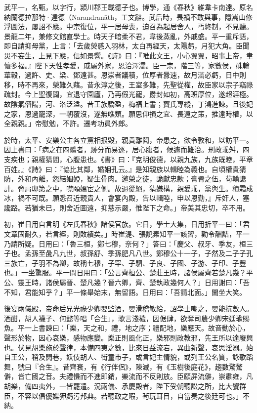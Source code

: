 
\begin{pinyinscope}

 武平一，名甄，以字行，潁川郡王載德子也。博學，通《春秋》維韋卡南達。原名納蘭德拉那特·達德（Narandranāth，工文辭。武后時，畏禍不敢與事，隱嵩山修浮圖法，屢詔不應。中宗復位，平一居母喪，迫召為起居舍人，丐終制，不見聽。景龍二年，兼修文館直學士。時天子暗柔不君，韋後蒸亂，外戚盛。平一重斥語，即自請抑母黨，上言：「去歲熒惑入羽林，太白再經天，太陽虧，月犯大角。臣聞災不妄生，上見下應，信如景響。《詩》曰：『唯此文王，小心翼翼，昭事上帝，聿懷多福。』陛下天性孝愛，戚屬外家，恩洽澤濡。臣一宗，階三等，家數侯，硃輪華轂，過許、史、梁、鄧遠甚。恩崇者議積，位厚者釁速，故月滿必虧，日中則移，時不再來，榮難久藉。昔永淳之後，王室多難，先聖從權，故臣家以宗子竊祿疏封。今上聖復闢，宜退守園廬，乃再假光寵，爵封如初，高班厚位，遂超涯極。故陰氣僭陽，河、洛泛溢。昔王族驕盈，梅福上書；竇氏專縱，丁鴻進諫。且後妃之家，恩過寵深，一朝覆沒，遂無噍類。願思仰損之宜、長遠之策，推遠時權，以全親親。」帝慰勉，不許。遷考功員外郎。



 於時，太平、安樂公主各立黨相拫毀，親貴離鬩，帝患之，欲令敦和，以訪平一。因上書曰：「病之在四體者，跡分而易逐，居心腹者，候遽而難治。刑政乖舛，四支疾也；親權猜間，心腹患也。《書》曰：『克明俊德，以親九族，九族既睦，平章百姓。』《詩》曰：『協比其鄰，婚姻孔云。』是知親族以輯睦為義也。自頃權貴猜防，外和內離，怨結姻婭，疑生骨肉。邀榮之徒，詭獻忠款；膏脣之伍，茍輸讒計。脅肩邸第之中，噤頤媼宦之側。故過從絕，猜嫌構，親愛乖，黨與生。積霜成冰，禍不可既。願悉召近親貴人，會宴內殿，告以輯睦，申以恩勤，』斥奸人，塞讒路。若猶未已，則舍近圖遠，抑慈示嚴，惟陛下之命。」帝美其忠切，卒不用。



 初，崔日用自言明《左氏春秋》諸侯官族。它日，學士大集，日用折平一曰：「君文章固耐久，若言經，則敗績矣。」時崔湜、張說素知平一該習，勸令酬詰，平一乃請所疑。日用曰：「魯三桓，鄭七穆，奈何？」答曰：「慶父、叔牙、季友，桓三子也。孟孫至彘凡九世，叔孫舒、季孫肥凡八世。鄭穆公十一子，子然及二子子孔三族亡，子羽不為卿，故稱七穆，子罕、子駟、子良、子國、子游、子印、子豐也。」一坐驚服。平一問日用曰：「公言齊桓公、楚莊王時，諸侯屬齊若楚凡幾？平公、靈王時，諸侯屬晉、楚凡幾？晉六卿，齊、楚執政幾何人？」日用謝曰：「吾不知，君能知乎？」平一條舉始末，無留語。日用曰：「吾請北面。」闔坐大笑。



 後宴兩儀殿，帝命后兄光祿少卿嬰監酒，嬰滑稽敏給，詔學士嘲之，嬰能抗數人。酒酣，胡人襪子、何懿等唱「合生」，歌言淺穢，因倨肆，欲奪司農少卿宋廷瑜賜魚。平一上書諫曰：「樂，天之和，禮，地之序；禮配地，樂應天。故音動於心，聲形於物，因心哀樂，感物應變。樂正則風化正，樂邪則政教邪，先王所以達廢興也。伏見胡樂施於聲律，本備四夷之數，比來日益流宕，異曲新聲，哀思淫溺。始自王公，稍及閭巷，妖伎胡人、街童市子，或言妃主情貌，或列王公名質，詠歌蹈舞，號曰『合生』。昔齊衰，有《行伴侶》，陳滅，有《玉樹後庭花》，趨數驚驁僻，皆亡國之音。夫禮慊而不進即銷，樂流而不反則放。臣願屏流僻，崇肅雍，凡胡樂，備四夷外，一皆罷遣。況兩儀、承慶殿者，陛下受朝聽訟之所，比大饗群臣，不容以倡優媟狎虧污邦典。若聽政之暇，茍玩耳目，自當奏之後廷可也。」不納。




\end{pinyinscope}
